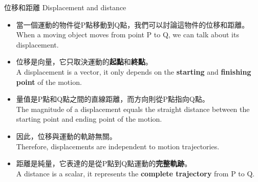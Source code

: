 \documentclass[beamer=true]{standalone}
\begin{document}
\begin{frame}{位移和距離 Displacement and distance}
    \begin{itemize}
        \item 當一個運動的物件從P點移動到Q點，我們可以討論這物件的位移和距離。 \\When a moving object moves from point P to Q, we can talk about its displacement.
        \item 位移是向量，它只取決運動的\textbf{起點}和\textbf{終點}。\\A displacement is a vector, it only depends on the \textbf{starting} and \textbf{finishing point} of the motion.
        \item 量值是P點和Q點之間的直線距離，而方向則從P點指向Q點。\\The magnitude of a displacement equals the straight distance between the starting point and ending point of the motion.
        \item 因此，位移與運動的軌跡無關。 \\Therefore, displacements are independent to motion trajectories.
        \item 距離是純量，它表達的是從P點到Q點運動的\textbf{完整軌跡}。
              \\A distance is a scalar, it represents the \textbf{complete trajectory} from P to Q.
    \end{itemize}
\end{frame}
\end{document}
